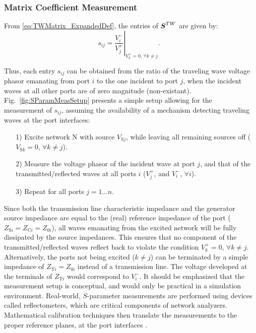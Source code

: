\subsubsection{Matrix Coefficient Measurement}
\par From \eqref{eq:TWMatrix_ExpandedDef}, the entries of $\boldsymbol{S}^{TW}$ are given by:
\begin{equation}
	s_{ij}=\left.\frac{V^-_i}{V^+_j}\right|_{V^+_k=0\textrm{, }\forall k\neq j}
	\textrm{.}
\end{equation}
%
\par Thus, each entry $s_{ij}$ can be obtained from the ratio of the traveling wave voltage phasor emanating from port $i$ to the one incident to port $j$, when the incident waves at all other ports are of zero magnitude (non-existant). Fig.~\ref{fig:SParamMeasSetup} presents a simple setup allowing for the measurement of $s_{ij}$, assuming the availability of a mechanism detecting traveling waves at the port interfaces:
\begin{itemize}%
	\item[1)]Excite network N with source $V_{\mathrm{S}j}$, while leaving all remaining sources off ($V_{\mathrm{S}k}=0$, $\forall k\neq j$).
	\item[2)]Measure the voltage phasor of the incident wave at port $j$, and that of the transmitted/reflected waves at all ports $i$ ($V^+_j$, and $V^-_i$, $\forall i$).
	\item[3)]Repeat for all ports $j=1\ldots n$.
\end{itemize}
%
\par Since both the transmission line characteristic impedance and the generator source impedance are equal to the (real) reference impedance of the port ($Z_{\mathrm{S}i}=Z_{\mathrm{C}i}=Z_{0i}$), all waves emanating from the excited network will be fully dissipated by the source impedances. This ensures that no component of the transmitted/reflected waves reflect back to violate the condition $V^+_k=0$, $\forall k\neq j$. Alternatively, the ports not being excited ($k\neq j$) can be terminated by a simple impedance of $Z_{\mathrm{T}i}=Z_{0i}$ instead of a transmission line. The voltage developed at the terminals of $Z_{\mathrm{T}i}$ would correspond to $V^-_i$. It should be emphasized that the measurement setup is conceptual, and would only be practical in a simulation environment. Real-world, $S$-parameter measurements are performed using devices called reflectometers\cite{pr:Engen_1979}\cite{pr:Eul_1991}, which are critical components of network analyzers. Mathematical calibration techniques then translate the measurements to the proper reference planes, at the port interfaces \cite{pr:Marks_1992}.
%
